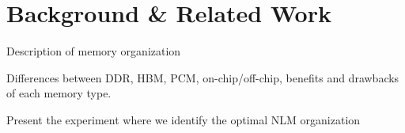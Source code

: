 
\section{Background \& Related Work}
\label{sec:Background}
Description of memory organization

Differences between DDR, HBM, PCM, on-chip/off-chip, benefits and drawbacks of each memory type.

Present the experiment where we identify the optimal NLM organization

